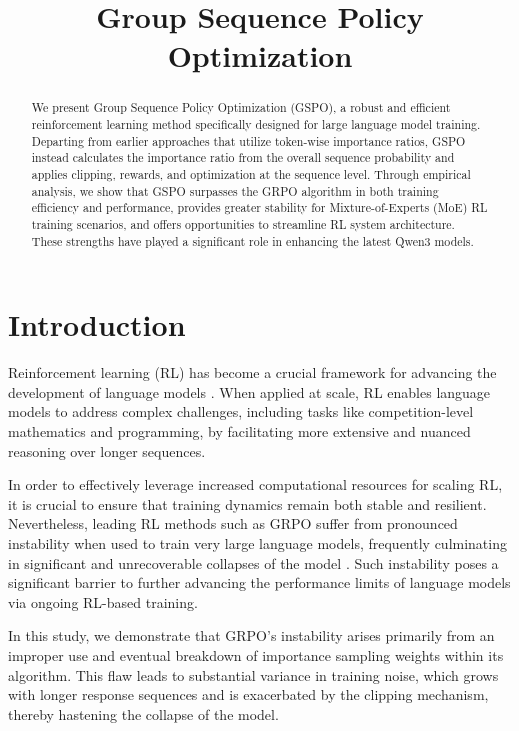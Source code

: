 \title{Group Sequence Policy Optimization}

\begin{abstract}
We present Group Sequence Policy Optimization (GSPO), a robust and efficient reinforcement learning method specifically designed for large language model training. Departing from earlier approaches that utilize token-wise importance ratios, GSPO instead calculates the importance ratio from the overall sequence probability and applies clipping, rewards, and optimization at the sequence level. Through empirical analysis, we show that GSPO surpasses the GRPO algorithm in both training efficiency and performance, provides greater stability for Mixture-of-Experts (MoE) RL training scenarios, and offers opportunities to streamline RL system architecture. These strengths have played a significant role in enhancing the latest Qwen3 models.
\end{abstract}

\section{Introduction}
\label{sec:intro}

Reinforcement learning (RL) has become a crucial framework for advancing the development of language models \citep{o1,dpsk-r1,qwq32b,qwen3}. When applied at scale, RL enables language models to address complex challenges, including tasks like competition-level mathematics and programming, by facilitating more extensive and nuanced reasoning over longer sequences.

In order to effectively leverage increased computational resources for scaling RL, it is crucial to ensure that training dynamics remain both stable and resilient. Nevertheless, leading RL methods such as GRPO \citep{grpo} suffer from pronounced instability when used to train very large language models, frequently culminating in significant and unrecoverable collapses of the model \citep{qwen3, minimax-m1}. Such instability poses a significant barrier to further advancing the performance limits of language models via ongoing RL-based training.

In this study, we demonstrate that GRPO's instability arises primarily from an improper use and eventual breakdown of importance sampling weights within its algorithm. This flaw leads to substantial variance in training noise, which grows with longer response sequences and is exacerbated by the clipping mechanism, thereby hastening the collapse of the model.

